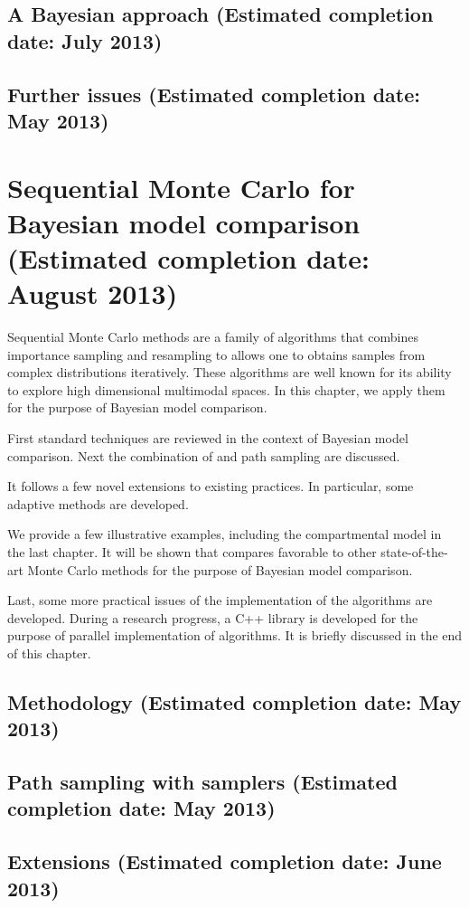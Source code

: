 \documentclass[11pt, fontset = Minion]{marticle}
\def\finish#1{(Estimated completion date: #1 2013)}
\begin{document}
\subsection{A Bayesian approach \finish{July}}

\subsection{Further issues \finish{May}}

\section{Sequential Monte Carlo for Bayesian model comparison \finish{August}}

Sequential Monte Carlo methods are a family of algorithms that combines
importance sampling and resampling to allows one to obtains samples from
complex distributions iteratively. These algorithms are well known for its
ability to explore high dimensional multimodal spaces. In this chapter, we
apply them for the purpose of Bayesian model comparison.

First standard techniques are reviewed in the context of Bayesian model
comparison. Next the combination of \smc and path sampling are discussed.

It follows a few novel extensions to existing practices. In particular, some
adaptive methods are developed.

We provide a few illustrative examples, including the \pet compartmental
model in the last chapter. It will be shown that \smc compares favorable to
other state-of-the-art Monte Carlo methods for the purpose of Bayesian model
comparison.

Last, some more practical issues of the implementation of the \smc algorithms
are developed. During a research progress, a C++ library is developed for the
purpose of parallel implementation of \smc algorithms. It is briefly discussed
in the end of this chapter.

\subsection{Methodology \finish{May}}

\subsection{Path sampling with \smc samplers \finish{May}}

\subsection{Extensions \finish{June}}
\end{document}
